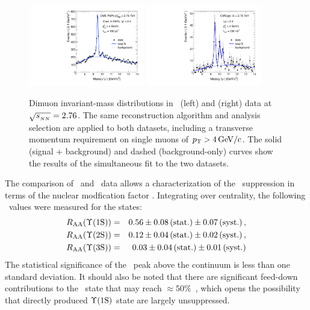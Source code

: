 \begin{figure}[t]
\begin{center}
    \includegraphics[width=0.45\textwidth]{qqbarfigures/hiFitPt4Erf}
    \includegraphics[width=0.45\textwidth]{qqbarfigures/ppFitPt4Erf}
    \caption{Dimuon invariant-mass distributions in \PbPb\ (left) and \pp (right)
data at $\sqrt{s_{_{NN}}} = 2.76$\TeV. The same reconstruction algorithm and analysis selection are applied to both datasets, including a transverse momentum requirement on single muons of $\mbox{$p_{\mathrm{T}}$} > 4\,\mathrm{GeV/c}$. The solid (signal + background) and dashed (background-only) curves show the results of the simultaneous fit to the two datasets.}
    \label{fig:GR:mass}
\end{center}
\end{figure}

The comparison of \pp\ and \PbPb\ data allows a characterization of the \PgU\ suppression
in terms of the nuclear modfication factor \Raa.
Integrating over centrality, the following \Raa\ values were measured for the \PgUn states:
\begin{eqnarray}
R_\mathrm{AA} (\Upsilon\mathrm{(1S)}) &=& 0.56 \pm 0.08\,\mbox{(stat.)} \pm 0.07\,\mbox{(syst.)} \,, \\
R_\mathrm{AA} (\Upsilon\mathrm{(2S)}) &=& 0.12 \pm 0.04\,\mbox{(stat.)} \pm 0.02\,\mbox{(syst.)} \,, \nonumber \\
R_\mathrm{AA} (\Upsilon\mathrm{(3S)}) &=& 0.03 \pm 0.04\,\mbox{(stat.)} \pm 0.01\,\mbox{(syst.)}  \nonumber\\
\end{eqnarray}
The statistical significance of the \PgUc\ peak above the continuum is less than one standard deviation.
It should also be noted that there are significant feed-down contributions to 
the \PgUa\ state that may reach $\approx 50\%$~\cite{Affolder:1999wm, Aaij:2012se},
which opens the possibility that directly produced $\Upsilon\mathrm{(1S)}$ state are largely unsuppressed.


